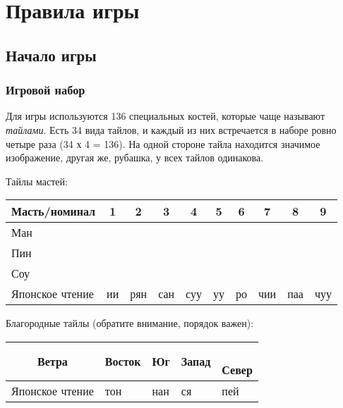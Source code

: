 \section{Правила игры}

\subsection{Начало игры}

\subsubsection{Игровой набор}

Для игры используются 136 специальных костей, которые чаще называют \textit{тайлами}. Есть 34 вида тайлов, и каждый из них встречается в наборе ровно четыре раза (34 х 4 = 136). На одной стороне тайла находится значимое изображение, другая же, рубашка, у всех тайлов одинакова.

Тайлы мастей:

\begin{tabular}{ |C{3.5cm}|c|c|c|c|c|c|c|c|c| } 
	\hline
	Масть/номинал & 1 & 2 & 3 & 4 & 5 & 6 & 7 & 8 & 9 \\
	\hline
	Ман \newline &  &  &  &  &  &  &  &  &  \rule[1ex]{0pt}{7ex} \\
	\hline
	Пин \newline &  &  &  &  &  &  &  &  &  \rule[1ex]{0pt}{7ex} \\
	\hline
	Соу \newline &  &  &  &  &  &  &  &  &  \rule[1ex]{0pt}{7ex} \\
	\hline
	Японское чтение & ии & рян & сан & суу & уу & ро & чии & паа & чуу \\
	\hline 
\end{tabular}


Благородные тайлы (обратите внимание, порядок важен):

\begin{tabular}{ |c|C{2cm}|C{2cm}|C{2cm}|C{2cm}| } 
	\hline
	 \rule[0ex]{0pt}{7ex} Ветра &  \newline Восток &  \newline Юг &  \newline Запад & { \newline Север} \\
	\hline
	Японское чтение & тон & нан & ся & пей \\
	\hline
\end{tabular}

